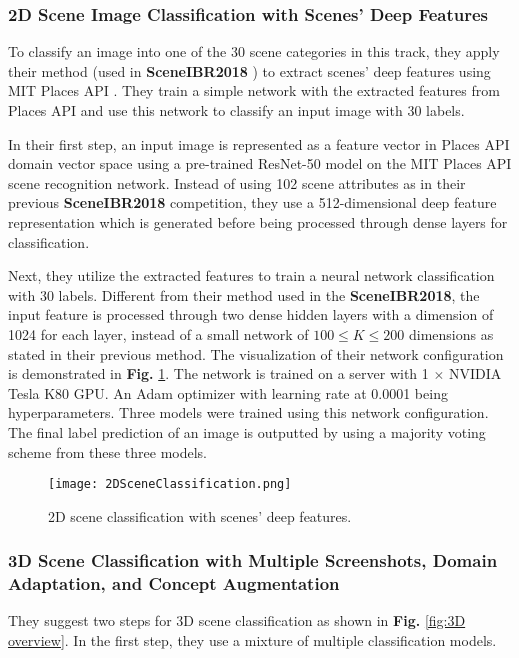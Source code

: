 \documentclass[../main.tex]{subfiles}
\begin{document}
	\subsubsection{2D Scene Image Classification with Scenes' Deep Features}
	
	To classify an image into one of the 30 scene categories in this track, 
	they apply their method (used in \textbf{SceneIBR2018} 
	\cite{SHREC18-SceneIBR-Track}) to extract scenes' deep features using MIT 
	Places API \cite{zhou2017places}. They train a simple network with the 
	extracted features from Places API and use this network to classify an 
	input image with 30 labels.
	
	In their first step, an input image is represented as a feature vector in 
	Places API domain vector space using a pre-trained ResNet-50 \cite{resnet} 
	model on the MIT Places API scene recognition network. Instead of using 102 
	scene attributes as in their previous \textbf{SceneIBR2018} competition, 
	they use a 512-dimensional deep feature representation which is generated 
	before being processed through dense layers for classification.
	
	Next, they utilize the extracted features to train a neural network 
	classification with 30 labels. Different from their method used in the 
	\textbf{SceneIBR2018}, the input feature is processed through two dense 
	hidden layers with a dimension of 1024 for each layer, instead of a small 
	network of $100 \le K \le 200$ dimensions as stated in their previous 
	method. The visualization of their network configuration is demonstrated in 
	\textbf{Fig.} \ref{fig:2DSceneClassificationNetwork}. The network is 
	trained on a server with 1 $\times$ NVIDIA Tesla K80 GPU. An Adam optimizer 
	with learning rate at 0.0001 being hyperparameters. Three models were 
	trained using this network configuration. The final label prediction of an 
	image is outputted by using a majority voting scheme from these three 
	models.
	
	\begin{figure}[h]
		\texttt{[image: 2DSceneClassification.png]}
		\centering
		\caption{2D scene classification with scenes' deep features.}
		\label{fig:2DSceneClassificationNetwork}
	\end{figure}
	
	
	\subsubsection{3D Scene Classification with Multiple Screenshots, Domain Adaptation, and Concept Augmentation}
	They suggest two steps for 3D scene classification as shown in 
	\textbf{Fig.} \ref{fig:3D overview}. In the first step, they use a mixture 
	of multiple classification models.
	
\end{document}

